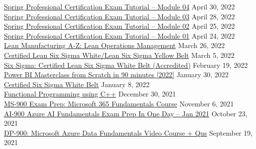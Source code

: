 \documentclass[10pt]{res} %
\begin{document}
\begin{resume}
\href{https://www.udemy.com/certificate/UC-4a345b61-ab5c-4a03-bb15-f2b39cf48378}{\color{blue}Spring Professional Certification Exam Tutorial -- Module 04} \hfill April 30, 2022 \\
\href{https://www.udemy.com/certificate/UC-2f6a715f-aa5a-448b-a75c-41a8c60b8b5f}{\color{blue}Spring Professional Certification Exam Tutorial -- Module 03} \hfill April 28, 2022 \\
\href{https://www.udemy.com/certificate/UC-ee55d117-5527-4c29-b7e4-00b458867158}{\color{blue}Spring Professional Certification Exam Tutorial -- Module 02} \hfill April 25, 2022 \\
\href{https://www.udemy.com/certificate/UC-4c29e742-226c-432c-8554-c805d94e833f}{\color{blue}Spring Professional Certification Exam Tutorial -- Module 01} \hfill April 24, 2022 \\
\href{https://www.udemy.com/certificate/UC-5a0e6da4-7ee7-46cd-911c-608bae72647e}{\color{blue}Lean Manufacturing A-Z: Lean Operations Management} \hfill March 26, 2022 \\
\href{https://www.udemy.com/certificate/UC-ef46fc6e-9be4-4522-bb29-1ef565b5a93a}{\color{blue}Certified Lean Six Sigma White/Lean Six Sigma Yellow Belt} \hfill March 5, 2022 \\
\href{https://www.udemy.com/certificate/UC-8410e298-9714-4fa8-85d3-2ad61ea54551}{\color{blue}Six Sigma: Certified Lean Six Sigma White Belt (Accredited)} \hfill February 19, 2022 \\
\href{https://www.udemy.com/certificate/UC-31feceee-cd9a-4b69-8897-8d73dc9fa08e}{\color{blue}Power BI Masterclass from Scratch in 90 minutes [2022]} \hfill January 30, 2022 \\
\href{https://www.udemy.com/certificate/UC-1db02f2e-0885-4a53-adcd-c768e31a5710}{\color{blue}Certified Six Sigma White Belt} \hfill January 8, 2022 \\
\href{https://www.udemy.com/certificate/UC-a339a1d4-8c75-4d50-9d8b-3b42429304cb}{\color{blue}Functional Programming using C++} \hfill December 30, 2021 \\
\href{https://www.udemy.com/certificate/UC-3f41283e-03aa-4004-b90b-0d647e59976f}{\color{blue}MS-900 Exam Prep: Microsoft 365 Fundamentals Course} \hfill November 6, 2021 \\
\href{https://www.udemy.com/certificate/UC-3f6db39a-c0b2-4b47-9292-1fc85e3c88ed}{\color{blue}AI-900 Azure AI Fundamentals Exam Prep In One Day -- Jan 2021} \hfill October 23, 2021 \\
\href{https://www.udemy.com/certificate/UC-71f0e47a-f80f-4f6b-9f17-760a9c42c1a5}{\color{blue}DP-900: Microsoft Azure Data Fundamentals Video Course + Qus} \hfill September 19, 2021


\end{resume}
\end{document}
